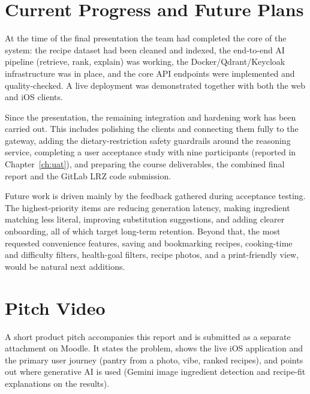 \section{Current Progress and Future Plans}
\label{sec:pm-progress}

At the time of the final presentation the team had completed the core of the
system: the recipe dataset had been cleaned and indexed, the end-to-end AI
pipeline (retrieve, rank, explain) was working, the Docker/Qdrant/Keycloak
infrastructure was in place, and the core API endpoints were implemented and
quality-checked. A live deployment was demonstrated together with both the web and
iOS clients.

Since the presentation, the remaining integration and hardening work has been
carried out. This includes polishing the clients and connecting them fully to the
gateway, adding the dietary-restriction safety guardrails around the reasoning
service, completing a user acceptance study with nine participants (reported in
Chapter~\ref{ch:uat}), and preparing the course deliverables, the combined final
report and the GitLab LRZ code submission.

Future work is driven mainly by the feedback gathered during acceptance testing.
The highest-priority items are reducing generation latency, making ingredient
matching less literal, improving substitution suggestions, and adding clearer
onboarding, all of which target long-term retention. Beyond that, the most
requested convenience features, saving and bookmarking recipes, cooking-time and
difficulty filters, health-goal filters, recipe photos, and a print-friendly
view, would be natural next additions.

\section{Pitch Video}

A short product pitch accompanies this report and is submitted as a separate
attachment on Moodle. It states the problem, shows the live iOS application and
the primary user journey (pantry from a photo, vibe, ranked recipes), and points
out where generative AI is used (Gemini image ingredient detection and
recipe-fit explanations on the results).
